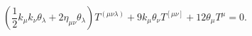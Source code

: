 \begin{equation}
(\frac{1}{2}k_{\mu }k_{\nu }\theta _{\lambda }+2\eta _{\mu \nu }\theta
_{\lambda })T^{(\mu \nu \lambda )}+9k_{\mu }\theta _{\nu }T^{[\mu \nu
]}+12\theta _{\mu }T^{\mu }=0.  \tag{36}
\end{equation}%
